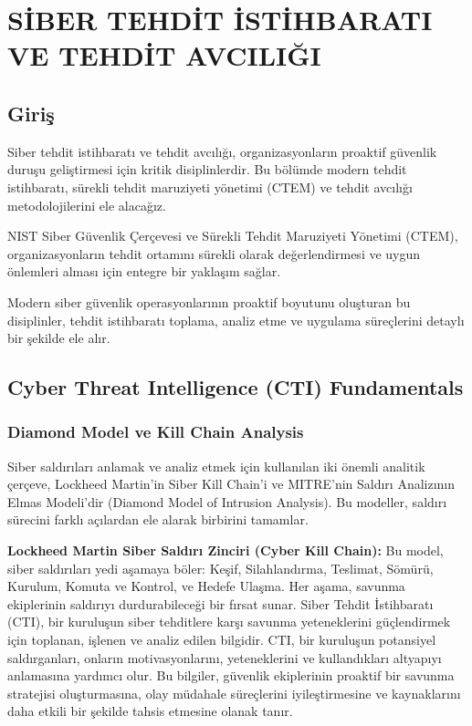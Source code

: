 \chapter{SİBER TEHDİT İSTİHBARATI VE TEHDİT AVCILIĞI}

\section*{Giriş}
Siber tehdit istihbaratı ve tehdit avcılığı, organizasyonların proaktif güvenlik duruşu geliştirmesi için kritik disiplinlerdir. Bu bölümde modern tehdit istihbaratı, sürekli tehdit maruziyeti yönetimi (CTEM) ve tehdit avcılığı metodolojilerini ele alacağız.

NIST Siber Güvenlik Çerçevesi ve Sürekli Tehdit Maruziyeti Yönetimi (CTEM), organizasyonların tehdit ortamını sürekli olarak değerlendirmesi ve uygun önlemleri alması için entegre bir yaklaşım sağlar.

Modern siber güvenlik operasyonlarının proaktif boyutunu oluşturan bu disiplinler, tehdit istihbaratı toplama, analiz etme ve uygulama süreçlerini detaylı bir şekilde ele alır.

\section{Cyber Threat Intelligence (CTI) Fundamentals}

\subsection{Diamond Model ve Kill Chain Analysis}

Siber saldırıları anlamak ve analiz etmek için kullanılan iki önemli analitik çerçeve, Lockheed Martin'in Siber Kill Chain'i ve MITRE'nin Saldırı Analizının Elmas Modeli'dir (Diamond Model of Intrusion Analysis). Bu modeller, saldırı sürecini farklı açılardan ele alarak birbirini tamamlar.

\textbf{Lockheed Martin Siber Saldırı Zinciri (Cyber Kill Chain):} Bu model, siber saldırıları yedi aşamaya böler: Keşif, Silahlandırma, Teslimat, Sömürü, Kurulum, Komuta ve Kontrol, ve Hedefe Ulaşma. Her aşama, savunma ekiplerinin saldırıyı durdurabileceği bir fırsat sunar.
Siber Tehdit İstihbaratı (CTI), bir kuruluşun siber tehditlere karşı savunma yeteneklerini güçlendirmek için toplanan, işlenen ve analiz edilen bilgidir. CTI, bir kuruluşun potansiyel saldırganları, onların motivasyonlarını, yeteneklerini ve kullandıkları altyapıyı anlamasına yardımcı olur. Bu bilgiler, güvenlik ekiplerinin proaktif bir savunma stratejisi oluşturmasına, olay müdahale süreçlerini iyileştirmesine ve kaynaklarını daha etkili bir şekilde tahsis etmesine olanak tanır.

